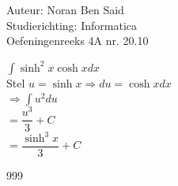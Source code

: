 \documentclass[a4paper]{article}
\begin{document}
  
\noindent \large Auteur: Noran Ben Said \\
\noindent \large Studierichting: Informatica\\
\noindent \large Oefeningenreeks 4A nr. 20.10\\

\medskip

\normalsize

$ \displaystyle\int \sinh^2x \cosh x dx $ \\

Stel
$u = \sinh x \Rightarrow du = \cosh x dx$\\

$ \Rightarrow \displaystyle\int u^2 du $ \\

$ = \dfrac{u^3}{3} + C $ \\

$ = \dfrac{\sinh^3 x}{3} + C $ \\


\begin{thebibliography}{999}
\end{thebibliography}
\end{document}
